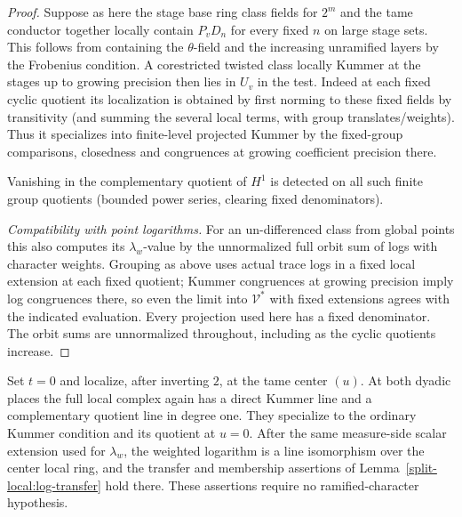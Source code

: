 \begin{proof}
Suppose as here the stage base ring class fields for \(2^m\) and the tame conductor together locally contain \(P_vD_n\) for every fixed \(n\) on large stage sets. This follows from containing the \(\theta\)-field and the increasing unramified layers by the Frobenius condition. A corestricted twisted class locally Kummer at the stages up to growing precision then lies in \(U_v\) in the test. Indeed at each fixed cyclic quotient its localization is obtained by first norming to these fixed fields by transitivity (and summing the several local terms, with group translates/weights). Thus it specializes into finite-level projected Kummer by the fixed-group comparisons, closedness and congruences at growing coefficient precision there.

Vanishing in the complementary quotient of \(H^1\) is detected on all such finite group quotients (bounded power series, clearing fixed denominators).

\smallskip\noindent\emph{Compatibility with point logarithms.}
For an un-differenced class from global points this also computes its \(\lambda_w\)-value by the unnormalized full orbit sum of logs with character weights. Grouping as above uses actual trace logs in a fixed local extension at each fixed quotient; Kummer congruences at growing precision imply log congruences there, so even the limit into \(\mathcal V^*\) with fixed extensions agrees with the indicated evaluation. Every projection used here has a fixed denominator. The orbit sums are unnormalized throughout, including as the cyclic quotients increase.
\end{proof}

\begin{lemma}\label{split-local:unramified-center}
Set \(t=0\) and localize, after inverting \(2\), at the tame center \((u)\). At both dyadic places the full local complex again has a direct Kummer line and a complementary quotient line in degree one. They specialize to the ordinary Kummer condition and its quotient at \(u=0\). After the same measure-side scalar extension used for \(\lambda_w\), the weighted logarithm is a line isomorphism over the center local ring, and the transfer and membership assertions of Lemma~\ref{split-local:log-transfer} hold there. These assertions require no ramified-character hypothesis.
\end{lemma}

